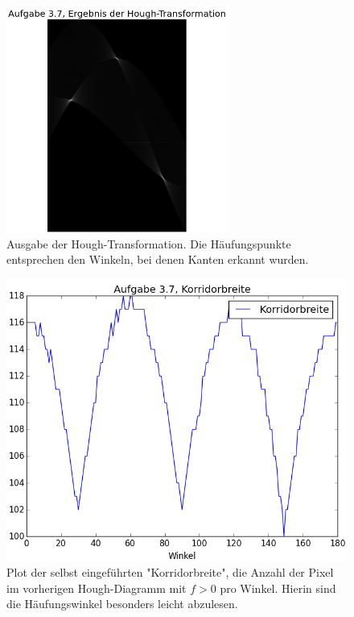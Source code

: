 \documentclass[12pt, a4paper, twoside]{report}
\begin{document}
\begin{figure}[h]
\centering
\includegraphics[width=0.65\textwidth]{../bilder/hough_1.png}
\caption{Ausgabe der Hough-Transformation. Die Häufungspunkte entsprechen den Winkeln, bei denen Kanten erkannt wurden.}
\label{hough_img}
\end{figure}

\begin{figure}[h]
\centering
\includegraphics[width=\textwidth]{../bilder/hough_2.png}
\caption{Plot der selbst eingeführten "Korridorbreite", die Anzahl der Pixel im vorherigen Hough-Diagramm mit $f > 0$ pro Winkel. Hierin sind die Häufungswinkel besonders leicht abzulesen.}
\label{hough_graph}
\end{figure}
\end{document}
